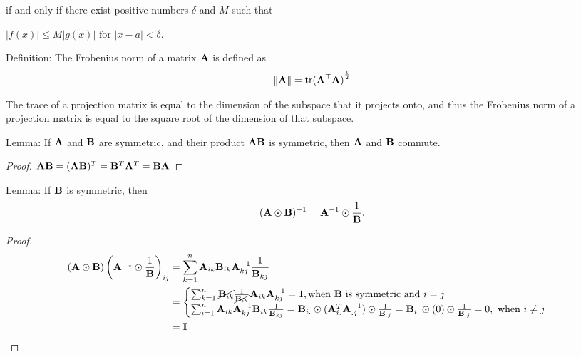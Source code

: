 \documentclass{amsart}[12pt]
\begin{document}
if and only if there exist positive numbers $\delta$ and $M$ such that

$|f(x)| \leq M |g(x)| \text{ for } |x - a| < \delta$.

Definition:
The Frobenius norm of a matrix ${\bf A}$ is defined as
\begin{align*}
\| {\bf A} \| = \text{tr}{({\bf A}^\top {\bf A})}^{\frac{1}{2}}
\end{align*}

The trace of a projection matrix is equal to the dimension of the subspace that it projects onto, and thus
the Frobenius norm of a projection matrix is equal to the square root of the dimension of that subspace.

Lemma:
If ${\bf A}$ and ${\bf B}$ are symmetric, and their product ${\bf A} {\bf B}$ is symmetric, then ${\bf A}$ and ${\bf B}$ commute.
\begin{proof}
${\bf A} {\bf B} = ({\bf A} {\bf B})^T = {\bf B}^T {\bf A}^T = {\bf B} {\bf A}$
\end{proof}

Lemma:
If ${\bf B}$ is symmetric, then
\[
({\bf A} \odot {\bf B})^{-1} = {\bf A}^{-1} \odot \frac{1}{{\bf B}}.
\]
\begin{proof}
\begin{align*}
({\bf A} \odot {\bf B})\left({\bf A}^{-1} \odot \frac{1}{{\bf B}}\right)_{ij} &= \sum_{k=1}^n {\bf A}_{ik} {\bf B}_{ik} {\bf A}^{-1}_{kj} \frac{1}{{\bf B}_{kj}} \\
&=
\begin{cases}
\sum_{k=1}^n \cancel{{\bf B}_{ik}} \frac{1}{\cancel{{\bf B}_{ik}}} {\bf A}_{ik} {\bf A}^{-1}_{kj} = 1, \text{when ${\bf B}$ is symmetric and $i = j$} \\
\sum_{i=1}^n {\bf A}_{ik} {\bf A}^{-1}_{kj} {\bf B}_{ik} \frac{1}{{\bf B}_{kj}}
= {\bf B}_{i.} \odot ({\bf A}^T_{i.} {\bf A}^{-1}_{.j}) \odot \frac{1}{{\bf B}_{.j}}
= {\bf B}_{i.} \odot (0) \odot \frac{1}{{\bf B}_{.j}}
= 0, \text{ when $i \ne j$}
\end{cases}\\
&= {\bf I}
\end{align*}
\end{proof}
\end{document}
